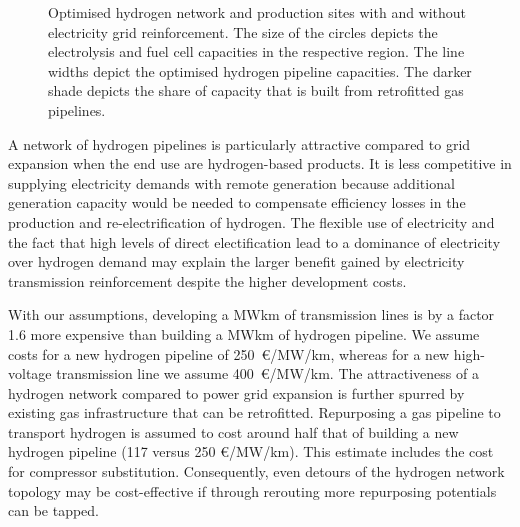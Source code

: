 \begin{figure}
    \centering
    \caption{Optimised hydrogen network and production sites with and without
    electricity grid reinforcement. The size of the circles depicts the
    electrolysis and fuel cell capacities in the respective region. The line
    widths depict the optimised hydrogen pipeline capacities. The darker shade
    depicts the share of capacity that is built from retrofitted gas pipelines.}
    \label{fig:h2-network}
\end{figure}


A network of hydrogen pipelines is particularly attractive compared to grid
expansion when the end use are hydrogen-based products. It is less
competitive in supplying electricity demands with remote generation because
additional generation capacity would be needed to compensate efficiency losses
in the production and re-electrification of hydrogen. The flexible use of
electricity and the fact that high levels of direct electification lead to a
dominance of electricity over hydrogen demand may explain the larger benefit
gained by electricity transmission reinforcement despite the higher development
costs.


With our assumptions, developing a MWkm of transmission lines is by a factor 1.6
more expensive than building a MWkm of hydrogen pipeline. We assume costs for a
new hydrogen pipeline of 250~\euro/MW/km, whereas for a new high-voltage
transmission line we assume 400~\euro/MW/km. The attractiveness of a hydrogen
network compared to power grid expansion is further spurred by existing gas
infrastructure that can be retrofitted. Repurposing a gas pipeline to transport
hydrogen is assumed to cost around half that of building a new hydrogen pipeline
(117 versus 250 \euro/MW/km). This estimate includes the cost for compressor
substitution. Consequently, even detours of the hydrogen network topology may be
cost-effective if through rerouting more repurposing potentials can be tapped.

